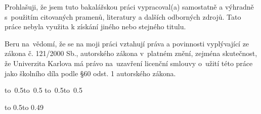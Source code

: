 \noindent
Prohlašuji, že jsem tuto bakalářskou práci vypracoval(a) samostatně a výhradně
s~použitím citovaných pramenů, literatury a dalších odborných zdrojů.
Tato práce nebyla využita k získání jiného nebo stejného titulu.

\medskip\noindent
Beru na~vědomí, že se na moji práci vztahují práva a povinnosti vyplývající
ze zákona č. 121/2000 Sb., autorského zákona v~platném znění, zejména skutečnost,
že Univerzita Karlova má právo na~uzavření licenční smlouvy o~užití této
práce jako školního díla podle §60 odst. 1 autorského zákona.

\vspace{10mm}

\hbox{\hbox to 0.5\hbox to 0.5\hsize{\dotfill\quad}}
\smallskip
\hbox{\hbox to 0.5\hsize{}\hbox to 0.5}

\vspace{20mm}
\newpage


\openright

\noindent
\Podekovani

\newpage


\openright

\vbox to 0.5\nobreak\vbox to 0.49

\newpage

\openright
\pagestyle{plain}
\setcounter{page}{1}

